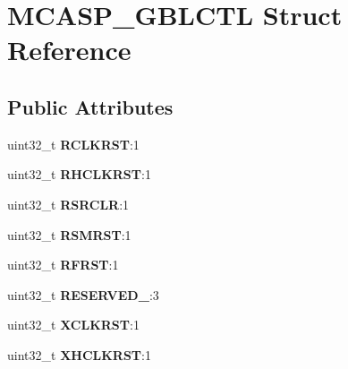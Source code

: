 \hypertarget{structMCASP__GBLCTL}{\section{M\-C\-A\-S\-P\-\_\-\-G\-B\-L\-C\-T\-L Struct Reference}
\label{structMCASP__GBLCTL}
}
\subsection*{Public Attributes}
\begin{DoxyCompactItemize}
\item 
\hypertarget{structMCASP__GBLCTL_a4faebf108a75d3a5e07c5a548b001054}{uint32\-\_\-t {\bfseries R\-C\-L\-K\-R\-S\-T}\-:1}\label{structMCASP__GBLCTL_a4faebf108a75d3a5e07c5a548b001054}

\item 
\hypertarget{structMCASP__GBLCTL_a4134c25e259e746763a431a048a2e046}{uint32\-\_\-t {\bfseries R\-H\-C\-L\-K\-R\-S\-T}\-:1}\label{structMCASP__GBLCTL_a4134c25e259e746763a431a048a2e046}

\item 
\hypertarget{structMCASP__GBLCTL_a7d9b6b7ea989957554415b4f7c41bac7}{uint32\-\_\-t {\bfseries R\-S\-R\-C\-L\-R}\-:1}\label{structMCASP__GBLCTL_a7d9b6b7ea989957554415b4f7c41bac7}

\item 
\hypertarget{structMCASP__GBLCTL_a6bdf8e5101a843b0d73e4b0145ab64da}{uint32\-\_\-t {\bfseries R\-S\-M\-R\-S\-T}\-:1}\label{structMCASP__GBLCTL_a6bdf8e5101a843b0d73e4b0145ab64da}

\item 
\hypertarget{structMCASP__GBLCTL_aaa496ffdc47b78fddea863ad0d550a4c}{uint32\-\_\-t {\bfseries R\-F\-R\-S\-T}\-:1}\label{structMCASP__GBLCTL_aaa496ffdc47b78fddea863ad0d550a4c}

\item 
\hypertarget{structMCASP__GBLCTL_af02bfb8526e8bed627340806b699ed07}{uint32\-\_\-t {\bfseries R\-E\-S\-E\-R\-V\-E\-D\-\_}\-:3}\label{structMCASP__GBLCTL_af02bfb8526e8bed627340806b699ed07}

\item 
\hypertarget{structMCASP__GBLCTL_adbd9134f87da08ad1e7532b195325512}{uint32\-\_\-t {\bfseries X\-C\-L\-K\-R\-S\-T}\-:1}\label{structMCASP__GBLCTL_adbd9134f87da08ad1e7532b195325512}

\item 
\hypertarget{structMCASP__GBLCTL_ad18444633d98bf3d062ff856e8f0c54f}{uint32\-\_\-t {\bfseries X\-H\-C\-L\-K\-R\-S\-T}\-:1}\label{structMCASP__GBLCTL_ad18444633d98bf3d062ff856e8f0c54f}


\end{DoxyCompactItemize}
